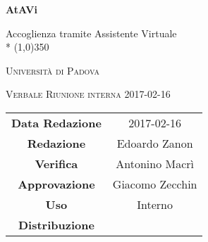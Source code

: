 \documentclass[a4paper,12pt]{article}
\author{Edoardo Zanon}
\date{2017/02/19}
\begin{document}
\begin{titlepage}
	\centering
	{\huge\bfseries AtAVi\par}
	Accoglienza tramite Assistente Virtuale \\*
	\line(1,0){350} \\
	{\scshape\LARGE Università di Padova \par}
	\vspace{1cm}
	{\scshape\Large Verbale Riunione interna 2017-02-16\par}
	\vspace{1.5cm}
	\logo
	\vspace{2cm}	
	\vfill \vfill

	\begin{tabular}{c|c}
		{\hfill\textbf{Data Redazione}} 		& 2017-02-16	\\
		{\hfill\textbf{Redazione}} 			& Edoardo Zanon		\\
		{\hfill\textbf{Verifica}} 				&  Antonino Macrì \\
		{\hfill\textbf{Approvazione}} 				&  Giacomo Zecchin \\
		{\hfill\textbf{Uso}} 				& Interno		\\
		{\hfill\textbf{Distribuzione}} 			& \kpanic\		\\
	\end{tabular}
\end{titlepage}

	\pagestyle{myfront}
	\newpage
	\tableofcontents

	\label{LastFrontPage}

	\newpage
	\pagestyle{mymain}
		
		
		
		
		
		
		
	
	\label{LastPage}
\end{document}

